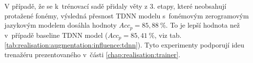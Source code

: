 V případě, že se k~trénovací sadě přidaly věty z 3. etapy, které neobsahují protažené fonémy, výsledná přesnost TDNN modelu s~fonémovým zerogramovým jazykovým modelem dosáhla hodnoty $Acc_{p} = 85,88~\%$.
To je lepší hodnota než v~případě baseline TDNN model ($Acc_{p} = 85,41~\%$, viz tab. \ref{tab:realisation:augmentation:influence:tdnn}).
Tyto experimenty podporují ideu trenažéru prezentovaného v~části \ref{chap:realisation:trainer}.
